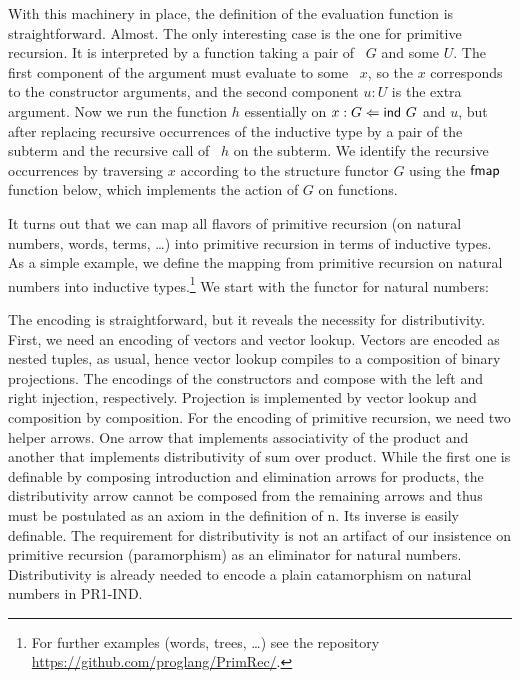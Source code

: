 \documentclass[a4paper,USenglish,cleveref, autoref, thm-restate]{lipics-v2021}
\begin{document}
With this machinery in place, the definition of the evaluation
function is straightforward. Almost.
\ccFunEval
The only interesting case is the one for primitive recursion. It is
interpreted by a function taking a pair of \Aind~$G$ and some $U$. The
first component of the argument must evaluate to some \Afold~$x$, so the $x$ corresponds
to the constructor arguments, and the second component $u:U$ is the
extra argument. Now we run the function $h$ essentially on
$x :{} G \Leftarrow \Aind~G$ and $u$, but 
after replacing recursive occurrences of the inductive type by a pair
of the subterm and the recursive call of {\AP}~$h$ on the subterm. We
identify the recursive occurrences by traversing $x$ according to the
structure functor $G$ using the $\Afmap$ function below, which
implements the action of $G$ on functions. 
\ccFunFmapSignature
\vspace{-1.5\baselineskip}
\ccFunFmap

It turns out that we can map all flavors of primitive recursion (on
natural numbers, words, terms, \dots) into primitive recursion in terms
of inductive types.
As a simple example, we define the mapping from primitive recursion on
natural numbers into inductive types.\footnote{For further examples
  (words, trees, \dots)
  see the repository \url{https://github.com/proglang/PrimRec/}.} We
start with the functor {\AGNat} for natural numbers:
\ccDefGNat

The encoding is straightforward, but it reveals the necessity for
distributivity. First, we need an 
encoding of vectors and vector lookup. Vectors are encoded as nested
tuples, as usual, hence vector lookup compiles to a composition of
binary projections.
\ccFunMkvec
\ccDefNatToInd
The encodings of the constructors {\ACZ} and {\ACS} compose {\Afold} with the left and right
injection, respectively. Projection is implemented by vector lookup
and composition by composition. For
the encoding of primitive recursion, we need two helper arrows. One
arrow that implements associativity of the product and another that
implements distributivity of sum over product. While the first one is
definable by composing introduction and elimination arrows for
products,  the distributivity arrow cannot be composed from the
remaining arrows and thus must be postulated as an axiom in the
definition of {\APR n}. Its inverse is easily definable.
\ccFunAssocDist
The requirement for distributivity is not an artifact of our
insistence on primitive recursion (paramorphism) as an eliminator for
natural numbers. Distributivity is already needed to encode a plain
catamorphism on natural numbers in PR1-IND.
\end{document}
